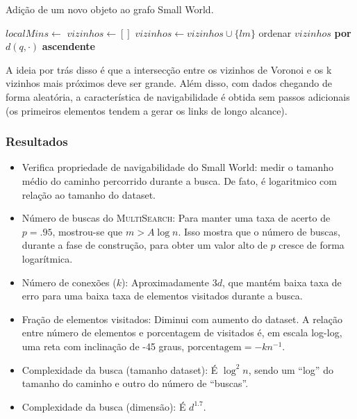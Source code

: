 \begin{algorithm}
\caption{Adição de um novo objeto ao grafo Small World.}
\label{alg:nsw_add}
\begin{algorithmic}[1]
\State $localMins \gets$ 
\State $vizinhos \gets []$
    \State $vizinhos \gets vizinhos \cup \{lm\}$
\EndFor
\State ordenar $vizinhos$ \textbf{por} $d(q, \cdot)$ \textbf{ascendente}
    \State {}
\EndFor
\EndProcedure
\end{algorithmic}
\end{algorithm}

A ideia por trás disso é que a intersecção entre os vizinhos de Voronoi e os k vizinhos mais próximos deve ser grande. Além disso, com dados chegando de forma aleatória, a característica de navigabilidade é obtida sem passos adicionais (os primeiros elementos tendem a gerar os links de longo alcance).

\subsubsection{Resultados}

\begin{itemize}
    \item Verifica propriedade de navigabilidade do Small World: medir o tamanho médio do caminho percorrido durante a busca. De fato, é logaritmico com relação ao tamanho do dataset.
    \item Número de buscas do \textsc{MultiSearch}: Para manter uma taxa de acerto de $p=.95$, mostrou-se que $m>A\log n$. Isso mostra que o número de buscas, durante a fase de construção, para obter um valor alto de $p$ cresce de forma logarítmica.
    \item Número de conexões ($k$): Aproximadamente $3d$, que mantém baixa taxa de erro para uma baixa taxa de elementos visitados durante a busca.
    \item Fração de elementos visitados: Diminui com aumento do dataset. A relação entre número de elementos e porcentagem de visitados é, em escala log-log, uma reta com inclinação de -45 graus, $\text{porcentagem} = -kn^{-1}$.
    \item Complexidade da busca (tamanho dataset): É $\log^2 n$, sendo um ``log'' do tamanho do caminho e outro do número de ``buscas''.
    \item Complexidade da busca (dimensão): É $d^{1.7}$.
\end{itemize}

